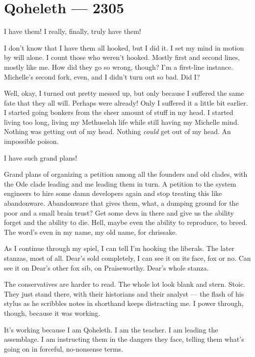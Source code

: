 \hypertarget{qoheleth-2305}{%
\chapter*{Qoheleth — 2305}\label{qoheleth-2305}}

I have them! I really, finally, truly have them!

I don't know that I have them all hooked, but I did it. I set my mind in motion by will alone. I count those who weren't hooked. Mostly first and second lines, mostly like me. How did they go so wrong, though? I'm a first-line instance. Michelle's second fork, even, and I didn't turn out so bad. Did I?

Well, okay, I turned out pretty messed up, but only because I suffered the same fate that they all will. Perhaps were already! Only I suffered it a little bit earlier. I started going bonkers from the sheer amount of stuff in my head. I started living too long, living my Methuselah life while still having my Michelle mind. Nothing was getting out of my head. Nothing \emph{could} get out of my head. An impossible poison.

I have such grand plans!

Grand plans of organizing a petition among all the founders and old clades, with the Ode clade leading and me leading them in turn. A petition to the system engineers to hire some damn developers again and stop treating this like abandonware. Abandonware that gives them, what, a dumping ground for the poor and a small brain trust? Get some devs in there and give us the ability forget and the ability to die. Hell, maybe even the ability to reproduce, to breed. The word's even in my name, my old name, for chrissake.

As I continue through my spiel, I can tell I'm hooking the liberals. The later stanzas, most of all. Dear's sold completely, I can see it on its face, fox or no. Can see it on Dear's other fox sib, on Praiseworthy. Dear's whole stanza.

The conservatives are harder to read. The whole lot look blank and stern. Stoic. They just stand there, with their historians and their analyst — the flash of his stylus as he scribbles notes in shorthand keeps distracting me. I power through, though, because it was working.

It's working because I am Qoheleth. I am the teacher. I am leading the assemblage. I am instructing them in the dangers they face, telling them what's going on in forceful, no-nonsense terms.

